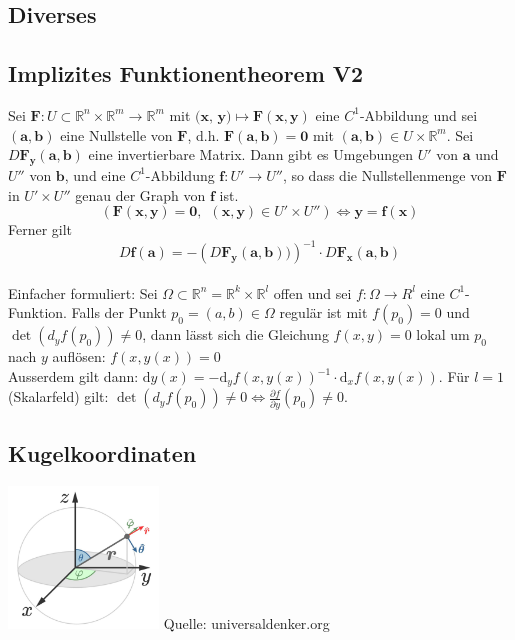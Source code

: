 \documentclass[8pt, a4paper, landscape, fleqn]{scrartcl}
\def\R{\mathbb{R}}
\def\d{\text{d}}
\begin{document}
\begin{multicols*}{3}
		\section{Diverses}
		\subsection{Implizites Funktionentheorem V2}
	    Sei $\textbf{F}: U \subset \mathbb{R}^n\times \mathbb{R}^m \to \mathbb{R}^m$ mit $\textbf{(x, y)} \mapsto \textbf{F}(\textbf{x}, \textbf{y})$ eine $C^1$-Abbildung und sei $(\textbf{a}, \textbf{b})$ eine Nullstelle von $\textbf{F}$, d.h. $\textbf{F}(\textbf{a}, \textbf{b})=\textbf{0}$ mit $(\textbf{a}, \textbf{b}) \in U \times \mathbb{R}^m$. Sei $D\textbf{F}_{\textbf{y}}(\textbf{a}, \textbf{b})$ eine invertierbare Matrix. Dann gibt es Umgebungen $U'$ von $\textbf{a}$ und $U''$ von $\textbf{b}$, und eine $C^1$-Abbildung $\textbf{f}: U' \to U''$, so dass die Nullstellenmenge von $\textbf{F}$ in $U'\times U''$ genau der Graph von $\textbf{f}$ ist.
		\begin{equation*}
			\left(\textbf{F}(\textbf{x}, \textbf{y})=\textbf{0}, \hspace{5pt} (\textbf{x}, \textbf{y}) \in U'\times U''\right) \Leftrightarrow \textbf{y}=\textbf{f}(\textbf{x})
		\end{equation*}
		Ferner gilt
		\begin{equation*}
			D\textbf{f}(\textbf{a})=-\left(D\textbf{F}_{\textbf{y}}(\textbf{a}, \textbf{b}))\right)^{-1}\cdot D\textbf{F}_{\textbf{x}}(\textbf{a}, \textbf{b})
		\end{equation*} \\
		Einfacher formuliert: Sei $\Omega \subset \R^n = \R^k \times \R^l$ offen und sei $f: \Omega \to R^l$ eine $C^1$-Funktion. Falls der Punkt $p_0 = (a, b) \in \Omega$ regulär ist mit $f(p_0) = 0$ und $\det(d_y f(p_0)) \neq 0$, dann lässt sich die Gleichung $f(x, y) = 0$ lokal um $p_0$ nach $y$ auflösen: $f(x, y(x)) = 0$ \\
		Ausserdem gilt dann: $\d y(x) = -\d_yf(x, y(x))^{-1}\cdot \d_xf(x, y(x))$. Für $l = 1$ (Skalarfeld) gilt: $\det(d_y f(p_0)) \neq 0 \Leftrightarrow \frac{\partial f}{\partial y}(p_0) \neq 0$.
		\subsection{Kugelkoordinaten}
		\includegraphics[width=4cm]{spherical-coordinates.jpg}
		\tiny{Quelle: universaldenker.org}\\
		\normalsize

\end{multicols*}
\end{document}

